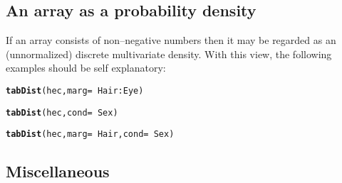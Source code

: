 \documentclass[10pt]{article}\usepackage[]{graphicx}\usepackage[]{xcolor}
\makeatletter
\newcommand{\hlopt}[1]{\textcolor[rgb]{0,0,0}{#1}}%
\newcommand{\hlstd}[1]{\textcolor[rgb]{0.345,0.345,0.345}{#1}}%
\newcommand{\hlkwc}[1]{\textcolor[rgb]{0.333,0.667,0.333}{#1}}%
\newcommand{\hlkwd}[1]{\textcolor[rgb]{0.737,0.353,0.396}{\textbf{#1}}}%
\newenvironment{kframe}{%
 \def\at@end@of@kframe{}%
 \ifinner\ifhmode%
  \def\at@end@of@kframe{\end{minipage}}%
  \begin{minipage}{\columnwidth}%
 \fi\fi%
 \def\FrameCommand##1{\hskip\@totalleftmargin \hskip-\fboxsep
 \colorbox{shadecolor}{##1}\hskip-\fboxsep
     \hskip-\linewidth \hskip-\@totalleftmargin \hskip\columnwidth}%
 \MakeFramed {\advance\hsize-\width
   \@totalleftmargin\z@ \linewidth\hsize
   \@setminipage}}%
 {\par\unskip\endMakeFramed%
 \at@end@of@kframe}
\newenvironment{knitrout}{}{} %
\makeatother
\begin{document}

\subsection{An array as a probability density}
\label{sec:an-array-as}

If an array consists of non--negative numbers then it may be regarded as an
(unnormalized) discrete multivariate density. With this view, the following
examples should be self explanatory:
\begin{knitrout}\small
{}\color{fgcolor}\begin{kframe}
\begin{alltt}
\hlkwd{tabDist}\hlstd{(hec,} \hlkwc{marg}\hlstd{=}\hlopt{~}\hlstd{Hair}\hlopt{:}\hlstd{Eye)}
\end{alltt}


{\ttfamily\noindent\bfseries{}}\begin{alltt}
\hlkwd{tabDist}\hlstd{(hec,} \hlkwc{cond}\hlstd{=}\hlopt{~}\hlstd{Sex)}
\end{alltt}


{\ttfamily\noindent\bfseries{}}\begin{alltt}
\hlkwd{tabDist}\hlstd{(hec,} \hlkwc{marg}\hlstd{=}\hlopt{~}\hlstd{Hair,} \hlkwc{cond}\hlstd{=}\hlopt{~}\hlstd{Sex)}
\end{alltt}


{\ttfamily\noindent\bfseries{}}\end{kframe}
\end{knitrout}

\subsection{Miscellaneous}
\label{sec:miscellaneous-1}
\end{document}
